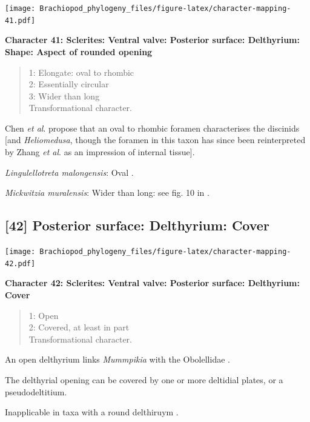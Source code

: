 \documentclass[openany]{book}
\theoremstyle{definition}
\theoremstyle{definition}
\theoremstyle{definition}
\theoremstyle{remark}
\begin{document}
\texttt{[image: Brachiopod\_phylogeny\_files/figure-latex/character-mapping-41.pdf]}

\textbf{Character 41: Sclerites: Ventral valve: Posterior surface:
Delthyrium: Shape: Aspect of rounded opening}

\begin{quote}
1: Elongate: oval to rhombic\\
2: Essentially circular\\
3: Wider than long\\
Transformational character.
\end{quote}

Chen \emph{et al}. \citeyearpar{Chen2007Reinterpretationof} propose that
an oval to rhombic foramen characterises the discinids {[}and
\emph{Heliomedusa}, though the foramen in this taxon has since been
reinterpreted by Zhang \emph{et al}.
\citeyearpar{Zhang2009Architectureand} as an impression of internal
tissue{]}.

\hypertarget{Lingulellotreta_malongensis-coding-41}{}
\emph{Lingulellotreta malongensis}: Oval
\citep{Williams2000LinguliformeaCraniiformea}.

\hypertarget{Mickwitzia_muralensis-coding-41}{}
\emph{Mickwitzia muralensis}: Wider than long: see fig. 10 in
\citet{Balthasar2004Shellstructure}.

\subsection*{{[}42{]} Posterior surface: Delthyrium:
Cover}\label{posterior-surface-delthyrium-cover}

\texttt{[image: Brachiopod\_phylogeny\_files/figure-latex/character-mapping-42.pdf]}

\textbf{Character 42: Sclerites: Ventral valve: Posterior surface:
Delthyrium: Cover}

\begin{quote}
1: Open\\
2: Covered, at least in part\\
Transformational character.
\end{quote}

An open delthyrium links \emph{Mummpikia} with the Obolellidae
\citep{Balthasar2008iMummpikia}.

The delthyrial opening can be covered by one or more deltidial plates,
or a pseudodeltitium.

Inapplicable in taxa with a round delthiruym \citep[generated by
overgrowth of the delthyrial opening by posterolateral parts of the
shell, per][]{Popov1992TheCambrian}.
\end{document}
